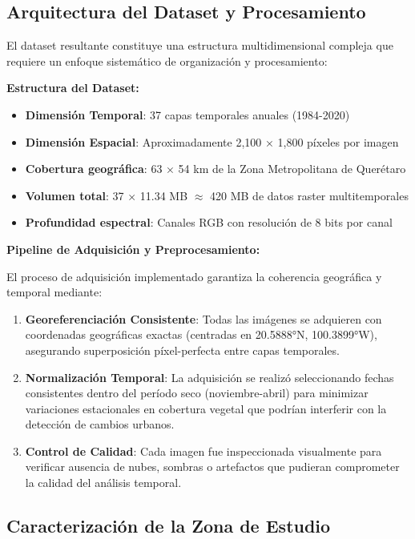 \documentclass[12pt,letterpaper]{article}
\begin{document}
\subsection{Arquitectura del Dataset y Procesamiento}

El dataset resultante constituye una estructura multidimensional compleja que requiere un enfoque sistemático de organización y procesamiento:

\textbf{Estructura del Dataset:}
\begin{itemize}
\item \textbf{Dimensión Temporal}: 37 capas temporales anuales (1984-2020)
\item \textbf{Dimensión Espacial}: Aproximadamente 2,100 × 1,800 píxeles por imagen
\item \textbf{Cobertura geográfica}: 63 × 54 km de la Zona Metropolitana de Querétaro
\item \textbf{Volumen total}: 37 × 11.34 MB $\approx$ 420 MB de datos raster multitemporales
\item \textbf{Profundidad espectral}: Canales RGB con resolución de 8 bits por canal
\end{itemize}

\textbf{Pipeline de Adquisición y Preprocesamiento:}

El proceso de adquisición implementado garantiza la coherencia geográfica y temporal mediante:

\begin{enumerate}
\item \textbf{Georeferenciación Consistente}: Todas las imágenes se adquieren con coordenadas geográficas exactas (centradas en 20.5888°N, 100.3899°W), asegurando superposición píxel-perfecta entre capas temporales.

\item \textbf{Normalización Temporal}: La adquisición se realizó seleccionando fechas consistentes dentro del período seco (noviembre-abril) para minimizar variaciones estacionales en cobertura vegetal que podrían interferir con la detección de cambios urbanos.

\item \textbf{Control de Calidad}: Cada imagen fue inspeccionada visualmente para verificar ausencia de nubes, sombras o artefactos que pudieran comprometer la calidad del análisis temporal.
\end{enumerate}

\subsection{Caracterización de la Zona de Estudio}
\end{document}
